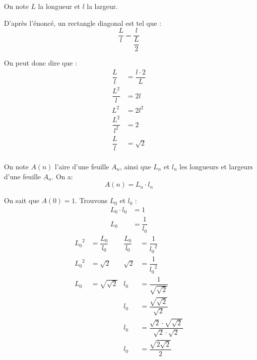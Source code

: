 

On note $L$ la longueur et $l$ la largeur.

D'après l'énoncé, un rectangle diagonal est tel que :
\begin{equation*}
	\dfrac{L}{l} = \dfrac{l}{\dfrac{L}{2}}
\end{equation*}

On peut donc dire que :
\begin{equation*}
	\begin{split}
		\dfrac{L}{l} & = \dfrac{l \cdot 2}{L} \\
		 \dfrac{L^2}{l} & = 2l \\
		 L^2 & = 2l^2 \\
		 \dfrac{L^2}{l^2} & = 2 \\
		 \dfrac{L}{l} & = \sqrt 2 \\
	\end{split}
\end{equation*}

On note $A(n)$ l'aire d'une feuille $A_n$, ainsi que $L_n$ et $l_n$ les longueurs et largeurs d'une feuille $A_n$. On a:
\begin{equation*}
	A(n) = L_n \cdot l_n
\end{equation*}

On sait que $A(0) = 1$. Trouvons $L_0$ et $l_0$ :
\begin{equation}
	\begin{split}
		L_0 \cdot l_0 & = 1 \\
		L_0 & = \dfrac 1 {l_0}
	\end{split}
\end{equation}
\begin{align*}
	{L_0}^2 &= \dfrac{L_0}{l_0} & \dfrac{L_0}{l_0}&=\dfrac 1 {{l_0}^2} \\
	{L_0}^2 &= \sqrt 2 & \sqrt{2}&=\dfrac 1 {{l_0}^2} \\
	L_0 &= \sqrt{\sqrt{2}} & l_0&=\dfrac{1}{\sqrt{\sqrt{2}}} \\
	& & l_0 &= \dfrac {\sqrt{\sqrt{2}}} {\sqrt{2}} \\
	& & l_0 &= \dfrac{\sqrt{2}\cdot\sqrt{ \sqrt{2}}}{\sqrt{2}\cdot\sqrt{2}}\\
	& & l_0 &= \dfrac{\sqrt{2\sqrt{2}}}{2}
\end{align*}

